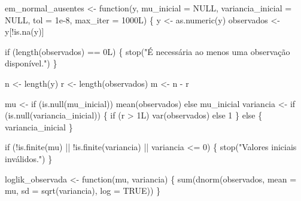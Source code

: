 \documentclass[
  letterpaper,
  DIV=11,
  numbers=noendperiod]{scrreprt}
\newenvironment{Shaded}{\begin{snugshade}}{\end{snugshade}}
\newcommand{\AttributeTok}[1]{\textcolor[rgb]{0.40,0.45,0.13}{#1}}
\newcommand{\ConstantTok}[1]{\textcolor[rgb]{0.56,0.35,0.01}{#1}}
\newcommand{\ControlFlowTok}[1]{\textcolor[rgb]{0.00,0.23,0.31}{#1}}
\newcommand{\DecValTok}[1]{\textcolor[rgb]{0.68,0.00,0.00}{#1}}
\newcommand{\FloatTok}[1]{\textcolor[rgb]{0.68,0.00,0.00}{#1}}
\newcommand{\FunctionTok}[1]{\textcolor[rgb]{0.28,0.35,0.67}{#1}}
\newcommand{\NormalTok}[1]{\textcolor[rgb]{0.00,0.23,0.31}{#1}}
\newcommand{\OtherTok}[1]{\textcolor[rgb]{0.00,0.23,0.31}{#1}}
\newcommand{\SpecialCharTok}[1]{\textcolor[rgb]{0.37,0.37,0.37}{#1}}
\newcommand{\StringTok}[1]{\textcolor[rgb]{0.13,0.47,0.30}{#1}}
\begin{document}
\begin{Shaded}
\begin{Highlighting}[]
\NormalTok{em\_normal\_ausentes }\OtherTok{\textless{}{-}} \ControlFlowTok{function}\NormalTok{(y,}
                                \AttributeTok{mu\_inicial =} \ConstantTok{NULL}\NormalTok{,}
                                \AttributeTok{variancia\_inicial =} \ConstantTok{NULL}\NormalTok{,}
                                \AttributeTok{tol =} \FloatTok{1e{-}8}\NormalTok{,}
                                \AttributeTok{max\_iter =} \DecValTok{1000}\NormalTok{L) \{}
\NormalTok{  y }\OtherTok{\textless{}{-}} \FunctionTok{as.numeric}\NormalTok{(y)}
\NormalTok{  observados }\OtherTok{\textless{}{-}}\NormalTok{ y[}\SpecialCharTok{!}\FunctionTok{is.na}\NormalTok{(y)]}

  \ControlFlowTok{if}\NormalTok{ (}\FunctionTok{length}\NormalTok{(observados) }\SpecialCharTok{==} \DecValTok{0}\NormalTok{L) \{}
    \FunctionTok{stop}\NormalTok{(}\StringTok{"É necessária ao menos uma observação disponível."}\NormalTok{)}
\NormalTok{  \}}

\NormalTok{  n }\OtherTok{\textless{}{-}} \FunctionTok{length}\NormalTok{(y)}
\NormalTok{  r }\OtherTok{\textless{}{-}} \FunctionTok{length}\NormalTok{(observados)}
\NormalTok{  m }\OtherTok{\textless{}{-}}\NormalTok{ n }\SpecialCharTok{{-}}\NormalTok{ r}

\NormalTok{  mu }\OtherTok{\textless{}{-}} \ControlFlowTok{if}\NormalTok{ (}\FunctionTok{is.null}\NormalTok{(mu\_inicial)) }\FunctionTok{mean}\NormalTok{(observados) }\ControlFlowTok{else}\NormalTok{ mu\_inicial}
\NormalTok{  variancia }\OtherTok{\textless{}{-}} \ControlFlowTok{if}\NormalTok{ (}\FunctionTok{is.null}\NormalTok{(variancia\_inicial)) \{}
    \ControlFlowTok{if}\NormalTok{ (r }\SpecialCharTok{\textgreater{}} \DecValTok{1}\NormalTok{L) }\FunctionTok{var}\NormalTok{(observados) }\ControlFlowTok{else} \DecValTok{1}
\NormalTok{  \} }\ControlFlowTok{else}\NormalTok{ \{}
\NormalTok{    variancia\_inicial}
\NormalTok{  \}}

  \ControlFlowTok{if}\NormalTok{ (}\SpecialCharTok{!}\FunctionTok{is.finite}\NormalTok{(mu) }\SpecialCharTok{||} \SpecialCharTok{!}\FunctionTok{is.finite}\NormalTok{(variancia) }\SpecialCharTok{||}\NormalTok{ variancia }\SpecialCharTok{\textless{}=} \DecValTok{0}\NormalTok{) \{}
    \FunctionTok{stop}\NormalTok{(}\StringTok{"Valores iniciais inválidos."}\NormalTok{)}
\NormalTok{  \}}

\NormalTok{  loglik\_observada }\OtherTok{\textless{}{-}} \ControlFlowTok{function}\NormalTok{(mu, variancia) \{}
    \FunctionTok{sum}\NormalTok{(}\FunctionTok{dnorm}\NormalTok{(observados,}
              \AttributeTok{mean =}\NormalTok{ mu,}
              \AttributeTok{sd =} \FunctionTok{sqrt}\NormalTok{(variancia),}
              \AttributeTok{log =} \ConstantTok{TRUE}\NormalTok{))}
\NormalTok{  \}}


\end{Highlighting}
\end{Shaded}
\end{document}
